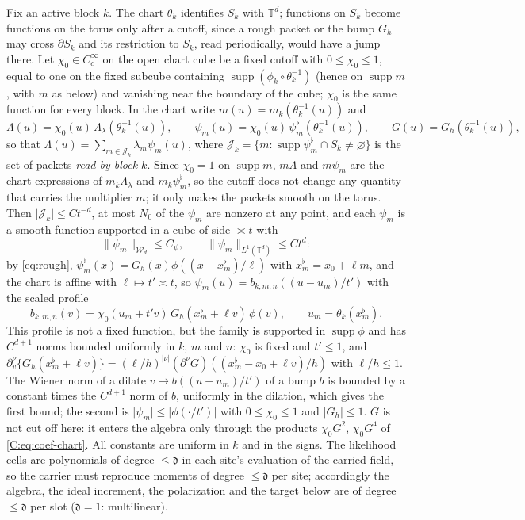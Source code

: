 \documentclass[11pt]{article}
\newcommand{\Torus}{\mathbb{T}}
\newcommand{\cW}{\mathcal{W}}
\newcommand{\cJ}{\mathcal{J}}
\newcommand{\norm}[1]{\lVert #1\rVert}
\newcommand{\abs}[1]{\lvert #1\rvert}
\newcommand{\dg}{\mathfrak{d}}
\begin{document}
Fix an active block \(k\).  The chart \(\theta_k\) identifies \(S_k\) with
\(\Torus^d\); functions on \(S_k\) become functions on the torus only after
a cutoff, since a rough packet or the bump \(G_h\) may cross \(\partial S_k\)
and its restriction to \(S_k\), read periodically, would have a jump there.
Let \(\chi_0\in C_c^\infty\) on the open chart cube be a fixed cutoff with
\(0\le\chi_0\le1\), equal
to one on the fixed subcube containing \(\operatorname{supp}(\phi_k\circ\theta_k^{-1})\)
(hence on \(\operatorname{supp}m\), with \(m\) as below) and vanishing near
the boundary of the cube; \(\chi_0\) is the same function for every block.
In the chart write \(m(u)=m_k(\theta_k^{-1}(u))\) and
\[
 \Lambda(u)=\chi_0(u)\,\Lambda_\lambda(\theta_k^{-1}(u)),\qquad
 \psi_m(u)=\chi_0(u)\,\psi^\flat_m(\theta_k^{-1}(u)),\qquad
 G(u)=G_h(\theta_k^{-1}(u)),
\]
so that \(\Lambda(u)=\sum_{m\in\cJ_k}\lambda_m\psi_m(u)\), where
\(\cJ_k=\{m:\operatorname{supp}\psi^\flat_m\cap S_k\ne\varnothing\}\) is the set
of packets \emph{read by block \(k\)}.  Since \(\chi_0=1\) on
\(\operatorname{supp}m\), \(m\Lambda\) and \(m\psi_m\) are the chart
expressions of \(m_k\Lambda_\lambda\) and \(m_k\psi^\flat_m\), so the cutoff
does not change any quantity that carries the multiplier \(m\); it only
makes the packets smooth on the torus.  Then \(\abs{\cJ_k}\le Ct^{-d}\), at
most \(N_0\) of the \(\psi_m\) are nonzero at any point, and each
\(\psi_m\) is a smooth function supported in a cube of side \(\asymp t\)
with
\[
 \norm{\psi_m}_{\cW_d}\le C_\psi,\qquad \norm{\psi_m}_{L^1(\Torus^d)}\le Ct^d :
\]
by \eqref{eq:rough}, \(\psi^\flat_m(x)=G_h(x)\phi((x-x^\flat_m)/\ell)\) with
\(x^\flat_m=x_0+\ell m\), and the chart is affine with \(\ell\mapsto t'\asymp t\),
so \(\psi_m(u)=b_{k,m,n}((u-u_m)/t')\) with the scaled profile
\[
 b_{k,m,n}(v)=\chi_0(u_m+t'v)\,G_h(x^\flat_m+\ell v)\,\phi(v),\qquad
 u_m=\theta_k(x^\flat_m).
\]
This profile is not a fixed function, but the family is supported in
\(\operatorname{supp}\phi\) and has \(C^{d+1}\) norms bounded uniformly in
\(k\), \(m\) and \(n\): \(\chi_0\) is fixed and \(t'\le1\), and
\(\partial_v^\nu\{G_h(x^\flat_m+\ell v)\}=(\ell/h)^{\abs\nu}(\partial^\nu G)((x^\flat_m-x_0+\ell v)/h)\)
with \(\ell/h\le1\).  The Wiener norm of a dilate
\(v\mapsto b((u-u_m)/t')\) of a bump \(b\) is bounded by a constant times
the \(C^{d+1}\) norm of \(b\), uniformly in the dilation, which gives the
first bound; the second is \(\abs{\psi_m}\le\abs{\phi(\cdot/t')}\) with
\(0\le\chi_0\le1\) and \(\abs{G_h}\le1\).  \(G\) is not cut off here:
it enters the algebra only through the products \(\chi_0G^2\), \(\chi_0G^4\)
of \eqref{C:eq:coef-chart}.  All constants are uniform in \(k\) and in the
signs.  The likelihood cells are polynomials of degree
\(\le\dg\) in each site's evaluation of the carried field, so the carrier
must reproduce moments of degree \(\le\dg\) per site; accordingly the
algebra, the ideal increment, the polarization and the target below are
of degree \(\le\dg\) per slot (\(\dg=1\): multilinear).
\end{document}
